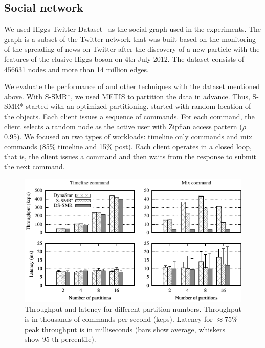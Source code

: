 \subsection{Social network}

We used Higgs Twitter Dataset~\cite{snapnets} as the social graph used in the experiments. 
The graph is a subset of the Twitter network that was built based on the monitoring of the spreading
of news on Twitter after the discovery of a new particle with the features of the elusive 
Higgs boson on 4th July 2012. The dataset consists of 456631 nodes and more than 14 million edges.

We evaluate the performance of \dynastar and other techniques with the dataset mentioned above. With S-SMR*, we used
METIS to partition the data in advance. Thus, S-SMR* started with an optimized partitioning. \dynastar started with
random location of the objects. Each client issues a sequence of commands.  
For each command, the client selects a random node as the active user with Zipfian access pattern ($\rho$ = 0.95).
We focused on two types of workloads: timeline only commands and mix commands (85\% timeline and 15\% post). 
Each client operates in a closed loop, that is, the client issues a command and then waits from the response to submit the next command.


%
\begin{figure}[ht]
 \includegraphics[width=0.99\columnwidth]{figures/experiments/chirper-compare-full}
 \caption{Throughput and latency for different partition numbers. 
  Throughput is in thousands of commands per second (kcps). 
  Latency for $\approx$75\% peak throughput is in milliseconds (bars show average, whiskers show 95-th percentile).}
  \label{fig:socialscalability}
\end{figure}

